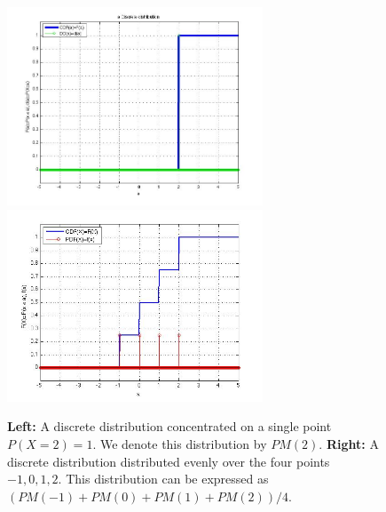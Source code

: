 \begin{figure}[t]
\begin{center}
\includegraphics[width=3in]{figs/Discrete1.jpg}
\includegraphics[width=3in]{figs/4PointMass.jpg}
\end{center}
\caption{{\bf Left:} A discrete distribution concentrated on a single
  point $P(X=2)=1$. We denote this distribution by $PM(2)$.  {\bf
    Right:} A discrete distribution distributed evenly over the four
  points $-1,0,1,2$. This distribution can be expressed as $(PM(-1)+PM(0)+PM(1)+PM(2))/4$.}
\end{figure}

